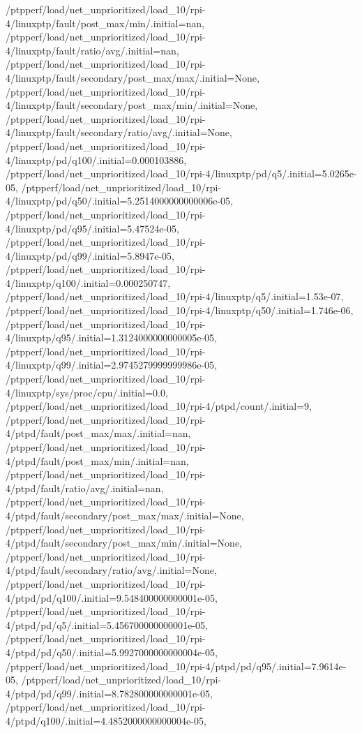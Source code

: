 {    /ptpperf/load/net_unprioritized/load_10/rpi-4/linuxptp/fault/post_max/min/.initial=nan,
    /ptpperf/load/net_unprioritized/load_10/rpi-4/linuxptp/fault/ratio/avg/.initial=nan,
    /ptpperf/load/net_unprioritized/load_10/rpi-4/linuxptp/fault/secondary/post_max/max/.initial=None,
    /ptpperf/load/net_unprioritized/load_10/rpi-4/linuxptp/fault/secondary/post_max/min/.initial=None,
    /ptpperf/load/net_unprioritized/load_10/rpi-4/linuxptp/fault/secondary/ratio/avg/.initial=None,
    /ptpperf/load/net_unprioritized/load_10/rpi-4/linuxptp/pd/q100/.initial=0.000103886,
    /ptpperf/load/net_unprioritized/load_10/rpi-4/linuxptp/pd/q5/.initial=5.0265e-05,
    /ptpperf/load/net_unprioritized/load_10/rpi-4/linuxptp/pd/q50/.initial=5.2514000000000006e-05,
    /ptpperf/load/net_unprioritized/load_10/rpi-4/linuxptp/pd/q95/.initial=5.47524e-05,
    /ptpperf/load/net_unprioritized/load_10/rpi-4/linuxptp/pd/q99/.initial=5.8947e-05,
    /ptpperf/load/net_unprioritized/load_10/rpi-4/linuxptp/q100/.initial=0.000250747,
    /ptpperf/load/net_unprioritized/load_10/rpi-4/linuxptp/q5/.initial=1.53e-07,
    /ptpperf/load/net_unprioritized/load_10/rpi-4/linuxptp/q50/.initial=1.746e-06,
    /ptpperf/load/net_unprioritized/load_10/rpi-4/linuxptp/q95/.initial=1.3124000000000005e-05,
    /ptpperf/load/net_unprioritized/load_10/rpi-4/linuxptp/q99/.initial=2.9745279999999986e-05,
    /ptpperf/load/net_unprioritized/load_10/rpi-4/linuxptp/sys/proc/cpu/.initial=0.0,
    /ptpperf/load/net_unprioritized/load_10/rpi-4/ptpd/count/.initial=9,
    /ptpperf/load/net_unprioritized/load_10/rpi-4/ptpd/fault/post_max/max/.initial=nan,
    /ptpperf/load/net_unprioritized/load_10/rpi-4/ptpd/fault/post_max/min/.initial=nan,
    /ptpperf/load/net_unprioritized/load_10/rpi-4/ptpd/fault/ratio/avg/.initial=nan,
    /ptpperf/load/net_unprioritized/load_10/rpi-4/ptpd/fault/secondary/post_max/max/.initial=None,
    /ptpperf/load/net_unprioritized/load_10/rpi-4/ptpd/fault/secondary/post_max/min/.initial=None,
    /ptpperf/load/net_unprioritized/load_10/rpi-4/ptpd/fault/secondary/ratio/avg/.initial=None,
    /ptpperf/load/net_unprioritized/load_10/rpi-4/ptpd/pd/q100/.initial=9.548400000000001e-05,
    /ptpperf/load/net_unprioritized/load_10/rpi-4/ptpd/pd/q5/.initial=5.456700000000001e-05,
    /ptpperf/load/net_unprioritized/load_10/rpi-4/ptpd/pd/q50/.initial=5.9927000000000004e-05,
    /ptpperf/load/net_unprioritized/load_10/rpi-4/ptpd/pd/q95/.initial=7.9614e-05,
    /ptpperf/load/net_unprioritized/load_10/rpi-4/ptpd/pd/q99/.initial=8.782800000000001e-05,
    /ptpperf/load/net_unprioritized/load_10/rpi-4/ptpd/q100/.initial=4.4852000000000004e-05,
}
